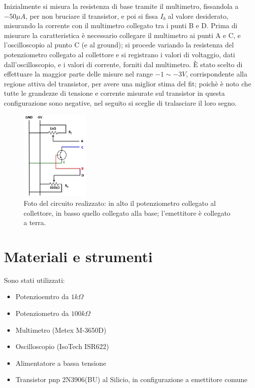\documentclass{article}
\begin{document}
Inizialmente si misura la resistenza di base tramite il multimetro, fissandola a $-50 \mu A$, per non bruciare il transistor, e poi si fissa $I_b$ al valore desiderato, misurando la corrente con il multimetro collegato tra i punti B e D.
Prima di misurare la caratteristica è necessario collegare il multimetro ai punti A e C, e l'oscilloscopio al punto C (e al ground); si procede variando la resistenza del potenziometro collegato al collettore e si registrano i valori di voltaggio, dati dall'oscilloscopio, e i valori di corrente, forniti dal multimetro.
È stato scelto di effettuare la maggior parte delle misure nel range $-1 \sim -3 V$, corrispondente alla regione attiva del transistor, per avere una miglior stima del fit; poichè è noto che tutte le grandezze di tensione e corrente misurate sul transistor in questa configurazione sono negative, nel seguito si sceglie di tralasciare il loro segno.
\begin{figure}[H]
    \centering
    \includegraphics[width=0.3\textwidth]{circuito.jpg}
    \caption{\label{fig:circuito}\centering Foto del circuito realizzato: in alto il potenziometro collegato al collettore, in basso quello collegato alla base; l'emettitore è collegato a terra.}
\end{figure}
\section{Materiali e strumenti}
Sono stati utilizzati:
\begin{itemize}
    \item Potenzioemtro da $1 k\Omega$
    \item Potenziometro da $100 k\Omega$
    \item Multimetro (Metex M-3650D)
    \item Oscilloscopio (IsoTech ISR622)
    \item Alimentatore a bassa tensione
    \item Transistor pnp 2N3906(BU) al Silicio, in configurazione a emettitore comune
\end{itemize}
\end{document}

